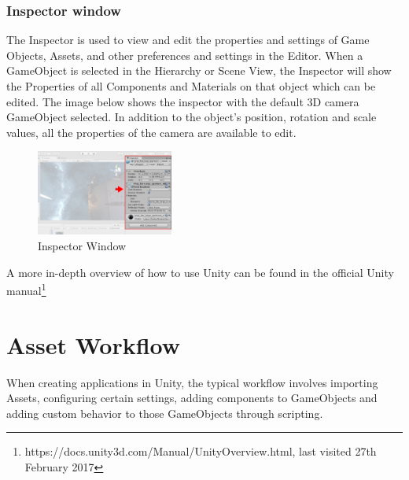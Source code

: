 \subsubsection{Inspector window}
The Inspector is used to view and edit the properties and settings of Game Objects, Assets, and other preferences and settings in the Editor. When a GameObject is selected in the Hierarchy or Scene View, the Inspector will show the Properties of all Components and Materials on that object which can be edited. The image below shows the inspector with the default 3D camera GameObject selected. In addition to the object’s position, rotation and scale values, all the properties of the camera are available to edit.
\begin{figure}[H]
  \centering
  \includegraphics[width=0.4\textwidth]{images/InspectorWindow.png}
  \caption{Inspector Window}
\end{figure}
A more in-depth overview of how to use Unity can be found in the official Unity manual\footnote[1]{https://docs.unity3d.com/Manual/UnityOverview.html, last visited 27th February 2017}

\section{Asset Workflow}
When creating applications in Unity, the typical workflow involves importing Assets, configuring certain settings, adding components to GameObjects and adding custom behavior to those GameObjects through scripting.

